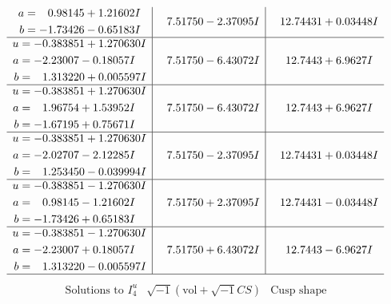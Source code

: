 \documentclass[1p]{elsarticle_modified}
\theoremstyle{definition}
\newcommand{\I}{\sqrt{-1}}
\begin{document}
$$\begin{array}{c|c|c}
\begin{aligned}
a &= \phantom{-}0.98145 + 1.21602 I \\
b &= -1.73426 - 0.65183 I\end{aligned}
 & \phantom{-}7.51750 - 2.37095 I & \phantom{-}12.74431 + 0.03448 I \\ \hline\begin{aligned}
u &= -0.383851 + 1.270630 I \\
a &= -2.23007 - 0.18057 I \\
b &= \phantom{-}1.313220 + 0.005597 I\end{aligned}
 & \phantom{-}7.51750 - 6.43072 I & \phantom{-}12.7443 + 6.9627 I \\ \hline\begin{aligned}
u &= -0.383851 + 1.270630 I \\
a &= \phantom{-}1.96754 + 1.53952 I \\
b &= -1.67195 + 0.75671 I\end{aligned}
 & \phantom{-}7.51750 - 6.43072 I & \phantom{-}12.7443 + 6.9627 I \\ \hline\begin{aligned}
u &= -0.383851 + 1.270630 I \\
a &= -2.02707 - 2.12285 I \\
b &= \phantom{-}1.253450 - 0.039994 I\end{aligned}
 & \phantom{-}7.51750 - 2.37095 I & \phantom{-}12.74431 + 0.03448 I \\ \hline\begin{aligned}
u &= -0.383851 - 1.270630 I \\
a &= \phantom{-}0.98145 - 1.21602 I \\
b &= -1.73426 + 0.65183 I\end{aligned}
 & \phantom{-}7.51750 + 2.37095 I & \phantom{-}12.74431 - 0.03448 I \\ \hline\begin{aligned}
u &= -0.383851 - 1.270630 I \\
a &= -2.23007 + 0.18057 I \\
b &= \phantom{-}1.313220 - 0.005597 I\end{aligned}
 & \phantom{-}7.51750 + 6.43072 I & \phantom{-}12.7443 - 6.9627 I\\
 \hline 
 \end{array}$$\newpage$$\begin{array}{c|c|c}  
\text{Solutions to }I^u_{4}& \I (\text{vol} + \sqrt{-1}CS) & \text{Cusp shape}\\
 \hline 
\begin{aligned}

\end{aligned}
\end{array}$$
\end{document}
